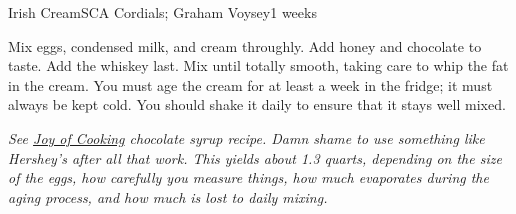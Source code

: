 \begin{recipe}{Irish Cream}{SCA Cordials; Graham Voysey}{1 weeks}
  
  Mix eggs, condensed milk, and cream throughly. Add honey and chocolate to
  taste. Add the whiskey last. Mix until totally smooth, taking care to whip
  the fat in the cream. You must age the cream for at least a week in the
  fridge; it must always be kept cold. You should shake it daily to ensure
  that it stays well mixed.
\end{recipe}
\textit{See \underline{Joy of Cooking} chocolate syrup recipe. Damn shame to
  use something like Hershey's after all that work. This yields about 1.3
  quarts, depending on the size of the eggs, how carefully you measure things,
  how much evaporates during the aging process, and how much is lost to daily
  mixing.}
